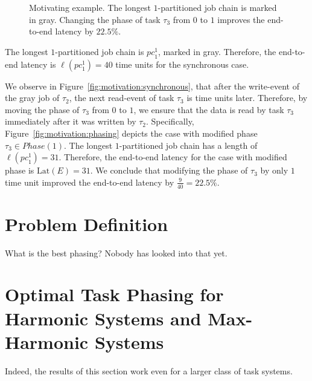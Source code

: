 \documentclass[10pt,conference]{resources/IEEEtran}
\theoremstyle{definition}
\theoremstyle{remark}
\newcommand{\lat}{\mathrm{Lat}}
\newcommand{\pc}{{pc}}
\theoremstyle{definition}
\begin{document}
\begin{figure}
{	
		\label{fig:motivation:phasing}}
		\caption{Motivating example. The longest $1$-partitioned job chain is marked in gray. Changing the phase of task $\tau_3$ from $0$ to $1$ improves the end-to-end latency by $22.5\%$.}
		\label{fig:motivation}
	\end{figure}
	The longest $1$-partitioned job chain is $\pc^1_1$, marked in gray. 
	Therefore, the end-to-end latency is $\ell(\pc^1_1) = 40$ time units for the synchronous case.
	
	We observe in Figure~\ref{fig:motivation:synchronous}, that after the write-event of the gray job of $\tau_2$, the next read-event of task $\tau_3$ is time units later. 
	Therefore, by moving the phase of $\tau_3$ from $0$ to $1$, we ensure that the data is read by task $\tau_3$ immediately after it was written by $\tau_2$.
	Specifically, Figure~\ref{fig:motivation:phasing} depicts the case with modified phase $\tau_3 \in \mathit{Phase}(1)$.
	The longest $1$-partitioned job chain has a length of $\ell(\pc^1_1) = 31$.
	Therefore, the end-to-end latency for the case with modified phase is $\lat(E) = 31$.
	We conclude that modifying the phase of $\tau_3$ by only $1$ time unit improved the end-to-end latency by $\frac{9}{40} = 22.5\%$.

	
	
\section{Problem Definition}
\label{sec:problem_def}

	What is the best phasing? Nobody has looked into that yet. 

\section{Optimal Task Phasing for Harmonic Systems and Max-Harmonic Systems}
\label{sec:harmonic}


	Indeed, the results of this section work even for a larger class of task systems. 
	
\end{document}
